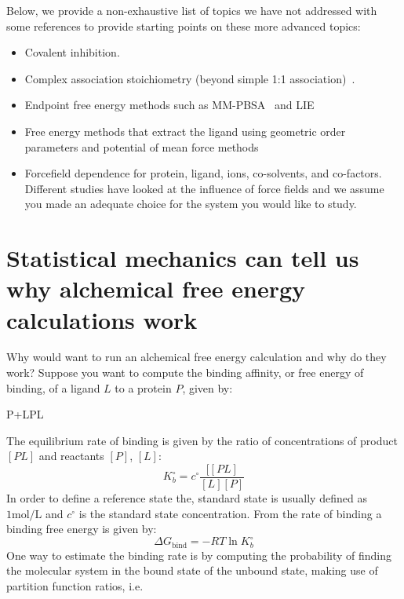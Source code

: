 \documentclass[9pt,bestpractices]{livecoms}
\begin{document}
Below, we provide a non-exhaustive list of topics we have not addressed with some references to provide starting points on these more advanced topics:
\begin{itemize}
\item Covalent inhibition.
\item Complex association stoichiometry (beyond simple 1:1 association)~\cite{awesome reference}. 
\item Endpoint free energy methods such as MM-PBSA~\cite{genheden2015mm} and LIE~\cite{gutierrez-de-terran2012linear}
\item Free energy methods that extract the ligand using geometric order parameters and potential of mean force methods~\cite{heinzelmann2017attachpullrelease}
\item Forcefield dependence for protein, ligand, ions, co-solvents, and co-factors. Different studies have looked at the influence of force fields and we assume you made an adequate choice for the system you would like to study.~\cite{loeffler2018reproducibility, vassetti2019assessment, lopes2015current} 
\end{itemize}


\section{Statistical mechanics can tell us why alchemical free energy calculations work}
\label{sec:theory}
Why would want to run an alchemical free energy calculation and why do they work? Suppose you want to compute the binding affinity, or free energy of binding, of a ligand $L$ to a protein $P$, given by:
\begin{euqation}
P+L\leftrightharpoons PL
\end{euqation}
The equilibrium rate of binding is given by the ratio of concentrations of product $[PL]$ and reactants $[P]$, $[L]$:
\begin{equation}
 K_b^{\circ} = c^{\circ}\frac{[[PL]}{[L][P]}
\end{equation}
In order to define a reference state the, standard state is usually defined as $1 \mathrm{mol}/\mathrm{L}$ and $c^\circ$ is the standard state concentration. From the rate of binding a binding free energy is given by:
\begin{equation}
    \Delta G_{\mathrm{bind}} = -RT\ln K_b^{\circ}
\end{equation}
One way to estimate the binding rate is by computing the probability of finding the molecular system in the bound state of the unbound state, making use of partition function ratios, i.e. 
\end{document}
